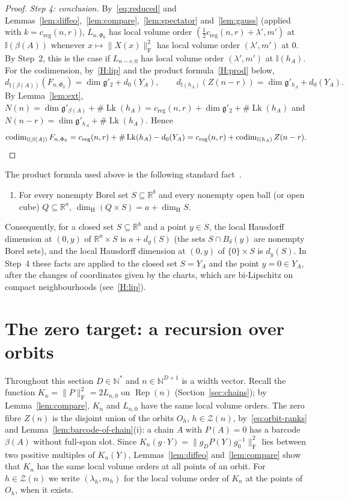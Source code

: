 \documentclass[11pt,a4paper]{article}
\theoremstyle{definition}
\theoremstyle{remark}
\numberwithin{equation}{section}
\newcommand{\N}{\mathbb{N}}
\newcommand{\R}{\mathbb{R}}
\newcommand{\Rep}{\operatorname{Rep}}
\newcommand{\codim}{\operatorname{codim}}
\newcommand{\dimH}{\dim_{\mathrm{H}}}
\newcommand{\Fr}[1]{\lVert #1\rVert_{\mathrm F}}
\newcommand{\creg}{c_{\mathrm{reg}}}
\newcommand{\Zb}{\mathcal Z}
\newcommand{\I}{\mathbb I}
\newcommand{\g}{\mathfrak g}
\newcommand{\Lk}{\operatorname{Lk}}
\begin{document}
\begin{proof}
\emph{Step 4: conclusion.} By~\eqref{eq:reduced} and Lemmas~\ref{lem:diffeo},~\ref{lem:compare},~\ref{lem:spectator} and~\ref{lem:gauss} (applied with $k=\creg(n,r)$), $L_{n,\Phi_0}$ has local volume order $(\frac12\creg(n,r)+\lambda',m')$ at $\I(\beta(A))$ whenever $x\mapsto\Fr{X(x)}^2$ has local volume order $(\lambda',m')$ at $0$. By Step~2, this is the case if $L_{n-r,0}$ has local volume order $(\lambda',m')$ at $\I(h_A)$. For the codimension, by~\ref{H:lip} and the product formula~\ref{H:prod} below,
\[
d_{\I(\beta(A))}(F_{n,\Phi_0})=\dim\g'_2+d_0(Y_A),\qquad d_{\I(h_A)}(Z(n-r))=\dim\g'_{h_A}+d_0(Y_A).
\]
By Lemma~\ref{lem:ext}, $N(n)=\dim\g'_{\beta(A)}+\#\Lk(h_A)=\creg(n,r)+\dim\g'_2+\#\Lk(h_A)$ and $N(n-r)=\dim\g'_{h_A}+\#\Lk(h_A)$. Hence
\[
\codim_{\I(\beta(A))}F_{n,\Phi_0}=\creg(n,r)+\#\Lk(h_A)-d_0(Y_A)=\creg(n,r)+\codim_{\I(h_A)}Z(n-r).\qedhere
\]
\end{proof}

The product formula used above is the following standard fact~\cite[Product formulae~7.2 and~7.3]{falconer}.
\begin{enumerate}[label=(H\arabic*),leftmargin=3em,start=4]
\item\label{H:prod} For every nonempty Borel set $S\subseteq\R^b$ and every nonempty open ball (or open cube) $Q\subseteq\R^a$, $\dimH(Q\times S)=a+\dimH S$.
\end{enumerate}
Consequently, for a closed set $S\subseteq\R^b$ and a point $y\in S$, the local Hausdorff dimension at $(0,y)$ of $\R^a\times S$ is $a+d_y(S)$ (the sets $S\cap B_\delta(y)$ are nonempty Borel sets), and the local Hausdorff dimension at $(0,y)$ of $\{0\}\times S$ is $d_y(S)$. In Step~4 these facts are applied to the closed set $S=Y_A$ and the point $y=0\in Y_A$, after the changes of coordinates given by the charts, which are bi-Lipschitz on compact neighbourhoods (see~\ref{H:lip}).
\section{The zero target: a recursion over orbits}\label{sec:zero}

Throughout this section $D\in\N^*$ and $n\in\N^{D+1}$ is a width vector. Recall the function $K_n=\Fr P^2=2L_{n,0}$ on $\Rep(n)$ (Section~\ref{sec:chains}); by Lemma~\ref{lem:compare}, $K_n$ and $L_{n,0}$ have the same local volume orders. The zero fibre $Z(n)$ is the disjoint union of the orbits $O_h$, $h\in\Zb(n)$, by~\eqref{eq:orbit-ranks} and Lemma~\ref{lem:barcode-of-chain}(i): a chain $A$ with $P(A)=0$ has a barcode $\beta(A)$ without full-span slot. Since $K_n(g\cdot Y)=\Fr{g_DP(Y)g_0^{-1}}^2$ lies between two positive multiples of $K_n(Y)$, Lemmas~\ref{lem:diffeo} and~\ref{lem:compare} show that $K_n$ has the same local volume orders at all points of an orbit. For $h\in\Zb(n)$ we write $(\lambda_h,m_h)$ for the local volume order of $K_n$ at the points of $O_h$, when it exists.
\end{document}
